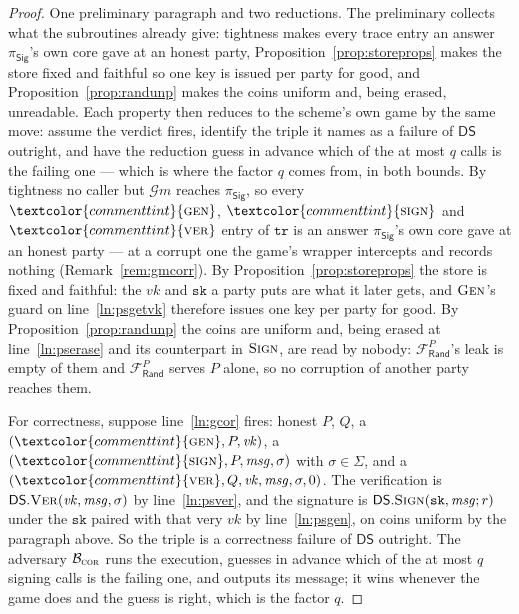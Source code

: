 \documentclass[10pt,oneside,openany]{book}
\newcommand{\op}[1]{\textnormal{\textsc{#1}}}
\newcommand{\atom}[1]{\textcolor{commenttint}{\op{#1}}}
\newcommand{\Gm}{\mathcal{G}m}
\newcommand{\Frand}{\mathcal{F}_{\mathsf{Rand}}}
\newcommand{\DS}{\mathsf{DS}}
\newcommand{\psig}{\pi_{\mathsf{Sig}}}
\newcommand{\vk}{\mathit{vk}}
\newcommand{\msg}{\mathit{msg}}
\newcommand{\Sigs}{\Sigma}
\newcommand{\V}[1]{\mathtt{#1}}
\theoremstyle{accentdef}
\theoremstyle{accentplain}
\begin{document}
\begin{proof}
One preliminary paragraph and two reductions. The preliminary collects what the subroutines already
give: tightness makes every trace entry an answer $\psig$'s own core gave at an honest party,
Proposition~\ref{prop:storeprops} makes the store fixed and faithful so one key is issued per party
for good, and Proposition~\ref{prop:randunp} makes the coins uniform and, being erased, unreadable.
Each property then reduces to the scheme's own game by the same move: assume the verdict fires,
identify the triple it names as a failure of $\DS$ outright, and have the reduction guess in advance
which of the at most $q$ calls is the failing one --- which is where the factor $q$ comes from, in
both bounds.
By tightness no caller but $\Gm$ reaches $\psig$, so every $\atom{gen}$, $\atom{sign}$ and $\atom{ver}$
entry of $\V{tr}$ is an answer $\psig$'s own core gave at an honest party --- at a corrupt one the
game's wrapper intercepts and records nothing (Remark~\ref{rem:gmcorr}). By
Proposition~\ref{prop:storeprops} the store is fixed and faithful: the $\vk$ and $\V{sk}$ a party
puts are what it later gets, and $\op{Gen}$'s guard on line~\ref{ln:psgetvk} therefore issues one
key per party for good. By Proposition~\ref{prop:randunp} the coins are uniform and, being erased
at line~\ref{ln:pserase} and its counterpart in $\op{Sign}$, are read by nobody: $\Frand^{P}$'s
leak is empty of them and $\Frand^{P}$ serves $P$ alone, so no corruption of another party reaches
them.

For correctness, suppose line~\ref{ln:gcor} fires: honest $P$, $Q$, a $(\atom{gen},P,\vk)$, a
$(\atom{sign},P,\msg,\sigma)$ with $\sigma \in \Sigs$, and a $(\atom{ver},Q,\vk,\msg,\sigma,0)$. The
verification is $\DS.\op{Ver}(\vk,\msg,\sigma)$ by line~\ref{ln:psver}, and the signature is
$\DS.\op{Sign}(\V{sk},\msg;r)$ under the $\V{sk}$ paired with that very $\vk$ by
line~\ref{ln:psgen}, on coins uniform by the paragraph above. So the triple is a correctness
failure of $\DS$ outright. The adversary $\mathcal{B}_{\op{cor}}$ runs the execution, guesses in advance which
of the at most $q$ signing calls is the failing one, and outputs its message; it wins whenever the
game does and the guess is right, which is the factor $q$.


\end{proof}
\end{document}
